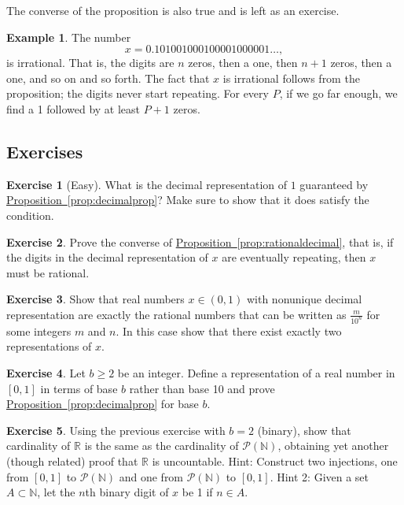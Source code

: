 \documentclass[12pt]{book}
\newcommand{\R}{{\mathbb{R}}}
\newcommand{\N}{{\mathbb{N}}}
\newcommand{\sP}{{\mathcal{P}}}
\theoremstyle{plain}
\theoremstyle{remark}
\theoremstyle{definition}
\theoremstyle{exercise}
\newtheorem{exercise}{Exercise}[section]
\theoremstyle{example}
\newtheorem{example}[thm]{Example}
\newcommand{\propref}[1]{\hyperref[#1]{Proposition~\ref*{#1}}}
\begin{document}
The converse of the proposition is also true and is left as an exercise.

\begin{example}
The number
\begin{equation*}
x = 0.101001000100001000001\ldots,
\end{equation*}
is irrational.
That is, the digits are $n$ zeros, then a one, then $n+1$
zeros, then a one, and so on and so forth.
The fact that $x$ is irrational follows from the
proposition; the digits never start repeating.
For every $P$,
if we go far enough, we find a 1 followed by at least $P+1$ zeros.
\end{example}

\subsection{Exercises}

\begin{exercise}[Easy]
What is the decimal representation of $1$ guaranteed by
\propref{prop:decimalprop}?  Make sure to show that it does satisfy
the condition.
\end{exercise}

\begin{exercise}
Prove the converse of \propref{prop:rationaldecimal}, that is,
if the digits in the decimal representation of $x$ are eventually repeating, then 
$x$ must be rational.
\end{exercise}

\begin{exercise} \label{exercise:nonuniquedecimals}
Show that real numbers $x \in (0,1)$ with nonunique decimal representation
are exactly the rational numbers that can be written
as $\frac{m}{10^n}$ for some integers $m$ and $n$.  In this case show that
there exist exactly two representations of $x$.
\end{exercise}

\begin{exercise}
Let $b \geq 2$ be an integer.  Define a representation of a real number in
$[0,1]$ in terms of base $b$ rather than base 10 and prove
\propref{prop:decimalprop} for base $b$.
\end{exercise}

\begin{exercise}
Using the previous exercise with $b=2$ (binary), 
show that cardinality of $\R$ is the same as the cardinality of $\sP(\N)$,
obtaining yet another (though related) proof that $\R$ is uncountable.
Hint: Construct two injections, one from $[0,1]$ to $\sP(\N)$
and one from $\sP(\N)$ to $[0,1]$.  Hint 2: Given a
set $A \subset \N$, let the $n$th binary digit of $x$ be 1 if $n\in A$.
\end{exercise}
\end{document}
